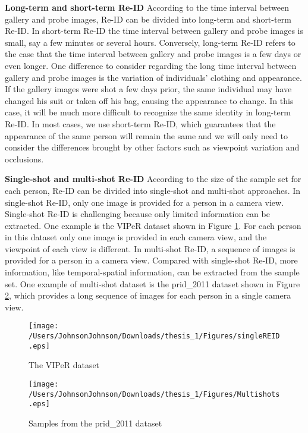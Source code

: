 \textbf{Long-term and short-term Re-ID} According to the time interval between gallery and probe images, Re-ID can be divided into long-term and short-term Re-ID.  In short-term Re-ID the time interval between gallery and probe images is small, say a few minutes or several hours. Conversely, long-term Re-ID refers to the case that the time interval between gallery and probe images is a few days or even longer. One difference to consider regarding the long time interval between gallery and probe images is the variation of individuals' clothing and appearance. If the gallery images were shot a few days prior, the same individual may have changed his suit or taken off his bag, causing the appearance to change. In this case, it will be much more difficult to recognize the same identity in long-term Re-ID. In most cases, we use short-term Re-ID, which guarantees that the appearance of the same person will remain the same and we will only need to consider the differences brought by other factors such as viewpoint variation and occlusions.


\textbf{Single-shot and multi-shot Re-ID} According to the size of the sample set for each person, Re-ID can be divided into single-shot and multi-shot approaches. In single-shot Re-ID, only one image is provided for a person in a camera view. Single-shot Re-ID is challenging because only limited information can be extracted. One example is the VIPeR dataset shown in Figure \ref{VIPeRimages}. For each person in this dataset only one image is provided in each camera view, and the viewpoint of each view is different. In multi-shot Re-ID, a sequence of images is provided for a person in a camera view. Compared with single-shot Re-ID, more information, like temporal-spatial information, can be extracted from the sample set. One example of multi-shot dataset is the prid\_2011 dataset shown in Figure \ref{PRID2011images}, which provides a long sequence of images for each person in a single camera view.

\begin{figure}[H]

\texttt{[image: /Users/JohnsonJohnson/Downloads/thesis\_1/Figures/singleREID.eps]}
\vspace{-3em}
\caption{The VIPeR dataset}
\label{VIPeRimages}
\end{figure}


\begin{figure}[H]

\texttt{[image: /Users/JohnsonJohnson/Downloads/thesis\_1/Figures/Multishots.eps]}
\vspace{-3em}
\caption{Samples from the prid\_2011 dataset}
\label{PRID2011images}
\end{figure}

